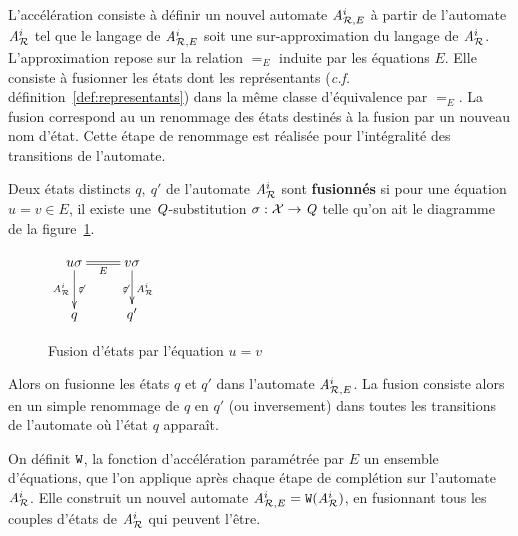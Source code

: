 L'accélération consiste à définir un nouvel automate ${\mathit A}_{\mathcal R,E}^i$ à partir de l'automate ${\mathit A}_{\mathcal R}^i$ tel 
que le langage de ${\mathit A}_{\mathcal R,E}^i$ soit une sur-approximation du langage de ${\mathit A}_{\mathcal R}^i$.
L'approximation repose sur la relation $=_E$ induite par les équations $E$. 
Elle consiste à fusionner les états dont les représentants (\textit{c.f.} définition~\ref{def:representants})
dans la même classe d'équivalence par $=_E$. La fusion correspond au un renommage des états destinés à la fusion
par un nouveau nom d'état. Cette étape de renommage est réalisée pour l'intégralité des transitions de l'automate.
\begin{definition}
  Deux états distincts $q,\ q'$ de l'automate ${\mathit A}_{\mathcal R}^i$ sont \textbf{fusionnés} si pour une équation $u=v \in E$,
  il existe une $\mathit Q$-substitution $\sigma : \mathcal X \rightarrow \mathit Q$ telle qu'on ait le diagramme de la figure~\ref{fig:fusion}.

  \begin{figure}[ht!]
    \centering
    $\xymatrix{
      u\sigma \ar@{=}[r]_{E}\ar[d]_{\aaex^i}^{\not\varepsilon} & v\sigma \ar[d]_{\not\varepsilon}^{\aaex^i}\\
      q & q'
    } $
    \caption{Fusion d'états par l'équation $u=v$}
    \label{fig:fusion}
  \end{figure}

  Alors on fusionne les états $q$ et $q'$ dans l'automate ${\mathit A}_{\mathcal R,E}^i$. 
  La fusion consiste alors en un simple renommage de $q$ en $q'$ (ou inversement) dans toutes
  les transitions de l'automate où l'état $q$ apparaît.
\end{definition}


\begin{definition}
  On définit $\mathtt{W}$, la fonction d'accélération paramétrée par $E$ un ensemble d'équations, 
  que l'on applique après chaque étape de complétion sur l'automate ${\mathit A}_{\mathcal R}^i$. Elle construit
  un nouvel automate ${\mathit A}_{\mathcal R,E}^i = \mathtt{W}({\mathit A}_{\mathcal R}^i)$, en fusionnant tous les couples d'états de ${\mathit A}_{\mathcal R}^i$
  qui peuvent l'être.
\end{definition}


